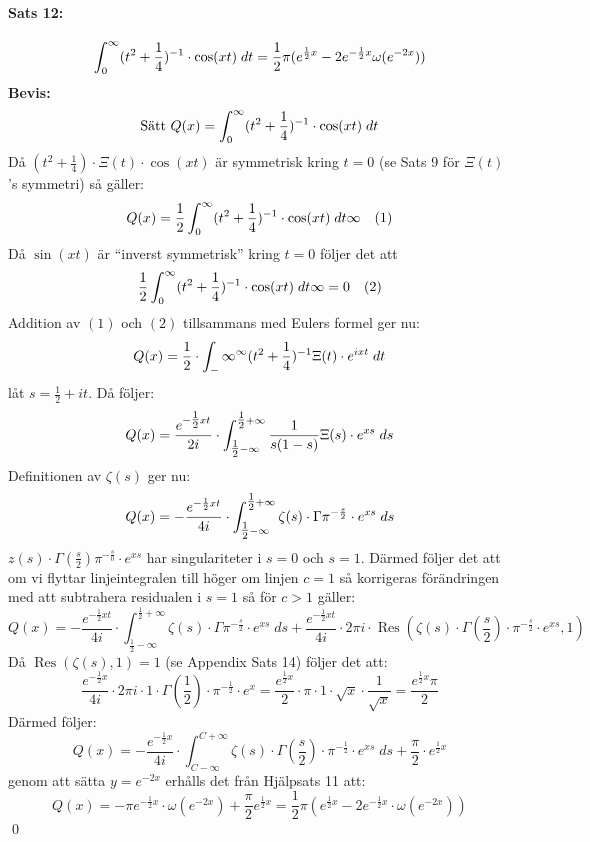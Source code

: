 \documentclass[a4paper]{article}%
\begin{document}
\paragraph{Sats 12:} 
\[
	\int_0^\infty (t^2 + \frac 1 4)^{-1} \cdot \cos(xt) \; dt = \frac 1 2 \pi(e^{\frac 1 2 x} -
		2e^{-\frac 1 2 x} \omega(e^{- 2 x}))
\]
{\bf Bevis:}\\
\[
	\text{Sätt } Q(x) = \int_0^\infty (t^2 + \frac 1 4)^{-1} \cdot \cos(xt) \; dt
\]
Då $(t^2 + \frac 1 4) \cdot \Xi(t) \cdot \cos(xt)$ är symmetrisk kring $t = 0$ (se Sats 9 för $\Xi(t)$'s symmetri)
så gäller:
\newcommand{\mQ} {
	\frac 1 2 \twelve{\infty}
}
\[
	Q(x) = \mQ \quad (1)
\]
Då $\sin(xt)$ är ``inverst symmetrisk'' kring $t = 0$ följer det att 
\[
	\mQ = 0 \quad (2)
\]
Addition av $(1)$ och $(2)$ tillsammans med Eulers formel ger nu: 
\[
	Q(x) = \frac 1 2 \cdot \int_-\infty^\infty (t^2 + \frac 1 4)^{-1} \Xi(t)\cdot e^{ixt} \; dt
\]
låt $s = \frac 1 2 + it$. Då följer:
\[
	Q(x) = \frac {
		e^{- \tfrac 1 2 x t}
	} {
		2i
	} \cdot \int_{\tfrac 1 2 - \infty}^{\tfrac 1 2 + \infty}
		\frac {1} {s(1-s)} \Xi(s) \cdot e^{xs} \; ds
\]
Definitionen av $\zeta(s)$ ger nu:
\[
	Q(x) = - \frac {
		e^{- \frac 1 2 xt}
	} {
		4i
	} \cdot \int_{\tfrac 1 2 - \infty}^{\tfrac 1 2 + \infty} \zeta(s) \cdot \Gamma
		\pi^{- \frac s 2} \cdot e^{xs} \; ds
\]
$z(s) \cdot \Gamma(\frac s 2) \pi^{- \frac s 0} \cdot e^{xs}$ har singulariteter i $s = 0$ och $s = 1$.
Därmed följer det att om vi flyttar linjeintegralen till höger om linjen $c=1$ så korrigeras förändringen med att 
subtrahera residualen i $s = 1$ så för $c > 1$ gäller:
\[
	Q(x) = - \frac {e^{- \frac 1 2 xt}} {4i} \cdot \int_{\tfrac 1 2 - \infty}^{\tfrac 1 2 + \infty} \zeta(s) \cdot \Gamma
		\pi^{- \frac s 2} \cdot e^{xs} \; ds + \frac {e^{- \frac 1 2 xt}} {4i} \cdot2 \pi i \cdot \operatorname{Res}(\zeta(s) \cdot
		\Gamma(\frac s 2) \cdot \pi^{-\frac s 2} \cdot e^{xs}, 1)
\]
Då $\operatorname{Res}(\zeta(s), 1) = 1$ (se Appendix Sats 14) följer det att:
\[
	\frac {e^{- \frac 1 2 x}} {4i} \cdot 2 \pi i \cdot 1 \cdot \Gamma(\frac 1 2) \cdot \pi^{- \frac 1 2} \cdot e^x =
		\frac {e^{\frac 1 2 x}} {2} \cdot \pi \cdot 1 \cdot \sqrt{x} \cdot \frac {1} {\sqrt{x}} = \frac {e^{\frac 1 2 x} \pi} {2}
\]
Därmed följer:
\[
	Q(x) = - \frac {e^{-\frac 1 2 x}} {4 i} \cdot \int_{C - \infty}^{C + \infty} \zeta(s) \cdot \Gamma(\frac s 2)
		\cdot \pi^{- \frac 1 2} \cdot e^{xs} \; ds + \frac \pi 2 \cdot e^{\frac 1 2 x}
\]
genom att sätta $y = e^{-2x}$ erhålls det från Hjälpsats 11 att:
\[
	Q(x) = - \pi e^{- \frac 1 2 x} \cdot \omega(e^{- 2 x}) + \frac \pi 2 e^{\frac 1 2 x} = \frac 1 2 \pi
		(e^{\frac 1 2 x} - 2 e^{- \frac 1 2 x} \cdot \omega(e^{-2x}))
\]
\hfill \qed
\end{document}
